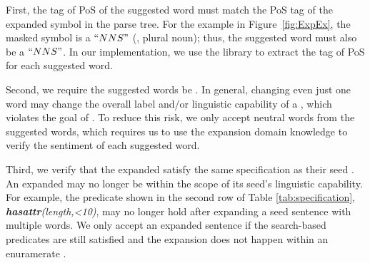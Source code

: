 First, the tag of PoS of the suggested word must match the PoS tag of the
expanded symbol in the parse tree. For the example in
Figure~\ref{fig:ExpEx}, the masked symbol is a $``NNS"$ (\ie, plural
noun); thus, the suggested word must also be a $``NNS"$. In our implementation, we use the \spacy \cite{spacy} library to extract the tag of PoS for each suggested word.

Second, we require the suggested words be \neu. 
In general, changing even just one word 
may change the overall label and/or linguistic capability of a \sent, which violates the goal of \tool. To reduce this risk, we only accept neutral words from the suggested words, which requires us to use the expansion domain knowledge to verify the sentiment of each suggested word.

Third, we verify that the expanded \sents satisfy the same \lc specification as their seed
\sents. 
An expanded \sent may no longer be within the scope of its seed's linguistic capability. For example, the predicate shown in the second row of Table \ref{tab:specification}, \emph{\textbf{hasattr}(length,<10)}, may no longer hold after expanding a seed sentence with multiple words.
We only accept an expanded sentence if the search-based predicates are still satisfied and the expansion does not happen within an enuramerate \ph.




